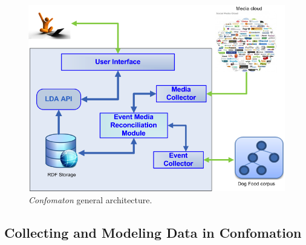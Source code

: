\begin{figure}[t!h]
 \centering
 \includegraphics[scale=0.35]{img/architecture.png}
 \caption{\emph{Confomaton} general architecture.}
 \label{fig:architecture}
\end{figure}

\subsection{Collecting and Modeling Data in Confomation}

